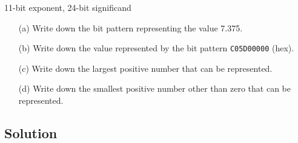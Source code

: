 \documentclass{article}
\begin{document}
\newcommand{\documentcourse}{COMP2120}
\newcommand{\documentnumber}{1}

11-bit exponent, 24-bit significand
\begin{enumerate}
    \item[(a)] Write down the bit pattern representing the value 7.375.
    \item[(b)] Write down the value represented by the bit pattern \texttt{C05D00000} (hex).
    \item[(c)] Write down the largest positive number that can be represented.
    \item[(d)] Write down the smallest positive number other than zero that can be represented.
\end{enumerate}

\subsection*{Solution}
\end{document}
